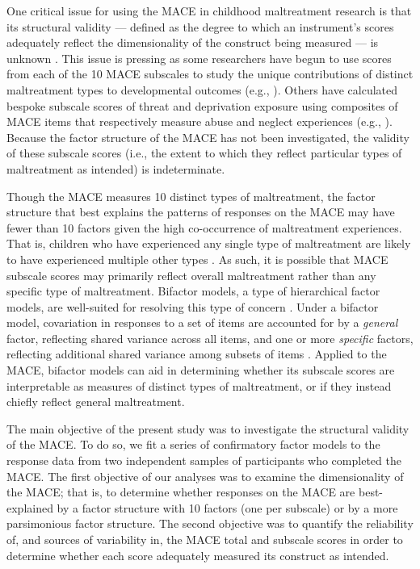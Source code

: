 \documentclass[letterpaper,man,natbib,longtable,floatsintext,12pt]{apa6}
\begin{document}
One critical issue for using the MACE in childhood maltreatment research is that its structural validity --- defined as the degree to which an instrument's scores adequately reflect the dimensionality of the construct being measured --- is unknown \citep{saini2019systematic}. This issue is pressing as some researchers have begun to use scores from each of the 10 MACE subscales to study the unique contributions of distinct maltreatment types to developmental outcomes (e.g., \citealt{schalinski2015type, gerke2018childhood, schalinski2019early}). Others have calculated bespoke subscale scores of threat and deprivation exposure using composites of MACE items that respectively measure abuse and neglect experiences (e.g., \citealt{schalinski2018defining, schalinski2019environmental, teicher2018differential}). Because the factor structure of the MACE has not been investigated, the validity of these subscale scores (i.e., the extent to which they reflect particular types of maltreatment as intended) is indeterminate.  

Though the MACE measures 10 distinct types of maltreatment, the factor structure that best explains the patterns of responses on the MACE may have fewer than 10 factors given the high co-occurrence of maltreatment experiences. That is, children who have experienced any single type of maltreatment are likely to have experienced multiple other types \citep{dong2004interrelatedness, herrenkohl2009assessing, kessler2010childhood}. As such, it is possible that MACE subscale scores may primarily reflect overall maltreatment rather than any specific type of maltreatment. Bifactor models, a type of hierarchical factor models, are well-suited for resolving this type of concern \citep{bornovalova2020appropriate}. Under a bifactor model, covariation in responses to a set of items are accounted for by a \emph{general} factor, reflecting shared variance across all items, and one or more \emph{specific} factors, reflecting additional shared variance among subsets of items \citep{Reise2012-ql}. Applied to the MACE, bifactor models can aid in determining whether its subscale scores are interpretable as measures of distinct types of maltreatment, or if they instead chiefly reflect general maltreatment. 

The main objective of the present study was to investigate the structural validity of the MACE. To do so, we fit a series of confirmatory factor models to the response data from two independent samples of participants who completed the MACE. The first objective of our analyses was to examine the dimensionality of the MACE; that is, to determine whether responses on the MACE are best-explained by a factor structure with 10 factors (one per subscale) or by a more parsimonious factor structure. The second objective was to quantify the reliability of, and sources of variability in, the MACE total and subscale scores in order to determine whether each score adequately measured its construct as intended. 
\end{document}
